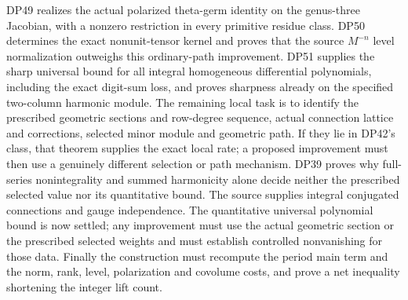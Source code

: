 \documentclass[11pt,a4paper]{article}
\theoremstyle{definition}\newtheorem{remark}[theorem]{Remark}
\begin{document}
DP49 realizes the actual polarized theta-germ identity on the genus-three Jacobian, with a nonzero restriction in every primitive residue class. DP50 determines the exact nonunit-tensor kernel and proves that the source $M^{-n}$ level normalization outweighs this ordinary-path improvement. DP51 supplies the sharp universal bound for all integral homogeneous differential polynomials, including the exact digit-sum loss, and proves sharpness already on the specified two-column harmonic module. The remaining local task is to identify the prescribed geometric sections and row-degree sequence, actual connection lattice and corrections, selected minor module and geometric path. If they lie in DP42's class, that theorem supplies the exact local rate; a proposed improvement must then use a genuinely different selection or path mechanism. DP39 proves why full-series nonintegrality and summed harmonicity alone decide neither the prescribed selected value nor its quantitative bound. The source supplies integral conjugated connections and gauge independence. The quantitative universal polynomial bound is now settled; any improvement must use the actual geometric section or the prescribed selected weights and must establish controlled nonvanishing for those data. Finally the construction must recompute the period main term and the norm, rank, level, polarization and covolume costs, and prove a net inequality shortening the integer lift count.
\end{document}
